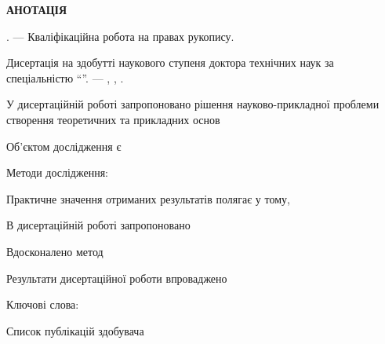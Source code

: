 \clearpage

{}

\begin{center}
\textbf{АНОТАЦІЯ}
\end{center}

\medskip

\textit{\dissauthorUa} \booknameUa.
--- Кваліфікаційна робота на правах рукопису.

Дисертація на здобутті наукового ступеня доктора технічних наук за спеціальністю
\dissSpecId ``\dissSpecUa''. --- \institutionUa, \belongUa, \bookyear.

У дисертаційній роботі запропоновано рішення науково-прикладної проблеми
створення теоретичних та прикладних основ

Об'єктом дослідження є 

Методи дослідження:

Практичне значення отриманих результатів полягає у тому,

В дисертаційній роботі запропоновано

Вдосконалено метод


Результати дисертаційної роботи впроваджено

Ключові слова:

\medskip

\begin{center}
Список публікацій здобувача
\end{center}






